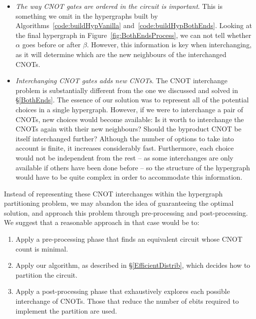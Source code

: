 \begin{itemize}
  \item \textit{The way CNOT gates are ordered in the circuit is important}. This is something we omit in the hypergraphs built by Algorithms~\ref{code:buildHypVanilla} and~\ref{code:buildHypBothEnds}. Looking at the final hypergraph in Figure~\ref{fig:BothEndsProcess}, we can not tell whether \(\alpha\) goes before or after \(\beta\). However, this information is key when interchanging, as it will determine which are the new neighbours of the interchanged CNOTs. %

  \item \textit{Interchanging CNOT gates adds new CNOTs}. The CNOT interchange problem is substantially different from the one we discussed and solved in \S\ref{BothEnds}. The essence of our solution was to represent all of the potential choices in a single hypergraph. However, if we were to interchange a pair of CNOTs, new choices would become available: Is it worth to interchange the CNOTs again with their new neighbours? Should the byproduct CNOT be itself interchanged further? Although the number of options to take into account is finite, it increases considerably fast. Furthermore, each choice would not be independent from the rest -- as some interchanges are only available if others have been done before -- so the structure of the hypergraph would have to be quite complex in order to accommodate this information.
\end{itemize}

Instead of representing these CNOT interchanges within the hypergraph partitioning problem, we may abandon the idea of guaranteeing the optimal solution, and approach this problem through pre-processing and post-processing. We suggest that a reasonable approach in that case would be to:
\begin{enumerate} 
\item Apply a pre-processing phase that finds an equivalent circuit whose CNOT count is minimal.
\item Apply our algorithm, as described in \S\ref{EfficientDistrib}, which decides how to partition the circuit. 
\item Apply a post-processing phase that exhaustively explores each possible interchange of CNOTs. Those that reduce the number of ebits required to implement the partition are used.
\end{enumerate}

